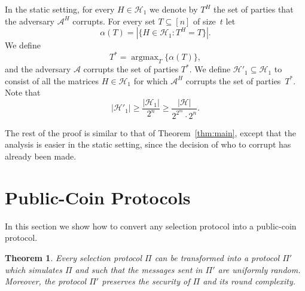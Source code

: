 \documentclass[11pt]{article}
\theoremstyle{plain}
\newtheorem{theorem}{Theorem}[section]
\theoremstyle{definition}
\numberwithin{equation}{section}
\DeclareMathOperator*{\argmax}{argmax}
\numberwithin{equation}{section} \newcommand{\aka} {also known as\ }
\newcommand{\abs}[1]{\left|#1\right|}
\newcommand{\Hc}{\mathcal H}
\newcommand{\1}{\mathbf{1}}
\newcommand{\Adv}{\mathcal A}
\theoremstyle{remark}
\begin{document}
In the static setting, for every $H\in\Hc_1$ we denote by $T^H$ the set of parties that the adversary $\Adv^H$  corrupts. For every set $T\subseteq[n]$ of size~$t$ let $$\alpha(T)=\abs{\{H\in\Hc_1: T^H=T\}}.
$$
We define
$$
T^*=\argmax_T\{\alpha(T)\},
$$
and the adversary $\Adv$ corrupts the set of parties $T^*$.
We define  $\Hc'_1\subseteq \Hc_1$ to consist of all the matrices $H\in\Hc_1$ for which $\Adv^H$ corrupts the set of parties~$T^*$.
Note that
$$
\abs{\Hc'_1}\geq\frac{\abs{\Hc_1}}{2^{n}}\geq\frac{\abs{\Hc}}{2^{2^m}\cdot2^{n}}.
$$

The rest of the proof is similar to that of Theorem~\ref{thm:main}, except that
the analysis is easier in the static setting, since the decision of who to
corrupt has already been made.

 \section{Public-Coin Protocols}\label{sec:public_coin}
 In this section we show how to convert any selection protocol into a
 public-coin protocol.

\begin{theorem}
  Every selection protocol $\Pi$ can be transformed into a protocol $\Pi'$ which
  simulates $\Pi$ and such that the messages sent in $\Pi'$ are uniformly
  random.  Moreover, the protocol $\Pi'$ preserves the security of $\Pi$ and its
  round complexity.
\end{theorem}
\end{document}
